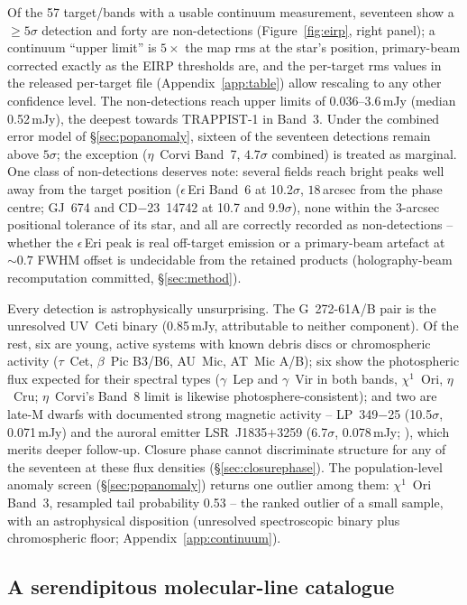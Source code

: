 \documentclass{openjournal}
\begin{document}
Of the 57 target/bands with a usable continuum measurement, seventeen
show a $\geq5\sigma$ detection and forty are non-detections
(Figure~\ref{fig:eirp}, right panel); a continuum ``upper limit'' is
$5\times$ the map rms at the star's position, primary-beam corrected
exactly as the EIRP thresholds are, and the per-target rms values in
the released per-target file (Appendix~\ref{app:table}) allow rescaling to any other confidence level.
The non-detections reach upper limits of 0.036--3.6\,mJy (median
0.52\,mJy), the deepest towards TRAPPIST-1 in Band~3. Under the
combined error model of \S\ref{sec:popanomaly}, sixteen of the
seventeen detections remain above $5\sigma$; the exception
($\eta$~Corvi Band~7, $4.7\sigma$ combined) is treated as marginal.
One class of non-detections deserves note: several fields reach
bright peaks well away from the target position ($\epsilon$\,Eri
Band~6 at 10.2$\sigma$, $18$\,arcsec from the phase centre; GJ~674
and CD$-$23~14742 at 10.7 and 9.9$\sigma$), none within the
$3$-arcsec positional tolerance of its star, and all are correctly
recorded as non-detections -- whether the $\epsilon$\,Eri peak is
real off-target emission or a primary-beam artefact at ${\sim}0.7$
FWHM offset is undecidable from the retained products
(holography-beam recomputation committed, \S\ref{sec:method}).

Every detection is astrophysically unsurprising. The G~272-61A/B pair
is the unresolved UV~Ceti binary (0.85\,mJy, attributable to neither
component). Of the rest, six are young, active systems with known
debris discs or chromospheric activity ($\tau$~Cet, $\beta$~Pic
B3/B6, AU~Mic, AT~Mic A/B); six show the photospheric flux expected
for their spectral types ($\gamma$~Lep and $\gamma$~Vir in both
bands, $\chi^{1}$~Ori, $\eta$~Cru; $\eta$~Corvi's Band~8 limit is
likewise photosphere-consistent); and two are late-M dwarfs with
documented strong magnetic activity -- LP~349$-$25 (10.5$\sigma$,
0.071\,mJy) and the auroral emitter LSR~J1835$+$3259 (6.7$\sigma$,
0.078\,mJy; \citealt{Hallinan2007}), which merits deeper follow-up.
Closure phase cannot discriminate structure for any of the seventeen
at these flux densities (\S\ref{sec:closurephase}). The
population-level anomaly screen (\S\ref{sec:popanomaly}) returns one
outlier among them: $\chi^{1}$~Ori Band~3, resampled tail probability
0.53 -- the ranked outlier of a small sample, with an astrophysical
disposition (unresolved spectroscopic binary plus chromospheric
floor; Appendix~\ref{app:continuum}).

\subsection{A serendipitous molecular-line catalogue}
\label{sec:linecatalogue}
\end{document}
